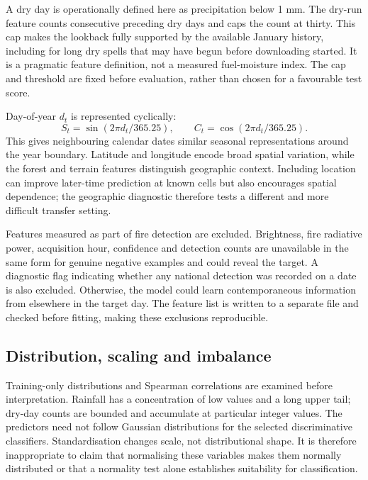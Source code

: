 \documentclass[conference,a4paper]{IEEEtran}
\begin{document}
A dry day is operationally defined here as precipitation below 1 mm. The dry-run feature counts consecutive preceding dry days and caps the count at thirty. This cap makes the lookback fully supported by the available January history, including for long dry spells that may have begun before downloading started. It is a pragmatic feature definition, not a measured fuel-moisture index. The cap and threshold are fixed before evaluation, rather than chosen for a favourable test score.

Day-of-year $d_t$ is represented cyclically:
\begin{equation}
S_t=\sin(2\pi d_t/365.25),\qquad C_t=\cos(2\pi d_t/365.25).
\end{equation}
This gives neighbouring calendar dates similar seasonal representations around the year boundary. Latitude and longitude encode broad spatial variation, while the forest and terrain features distinguish geographic context. Including location can improve later-time prediction at known cells but also encourages spatial dependence; the geographic diagnostic therefore tests a different and more difficult transfer setting.

Features measured as part of fire detection are excluded. Brightness, fire radiative power, acquisition hour, confidence and detection counts are unavailable in the same form for genuine negative examples and could reveal the target. A diagnostic flag indicating whether any national detection was recorded on a date is also excluded. Otherwise, the model could learn contemporaneous information from elsewhere in the target day. The feature list is written to a separate file and checked before fitting, making these exclusions reproducible.

\subsection{Distribution, scaling and imbalance}
Training-only distributions and Spearman correlations are examined before interpretation. Rainfall has a concentration of low values and a long upper tail; dry-day counts are bounded and accumulate at particular integer values. The predictors need not follow Gaussian distributions for the selected discriminative classifiers. Standardisation changes scale, not distributional shape. It is therefore inappropriate to claim that normalising these variables makes them normally distributed or that a normality test alone establishes suitability for classification.
\end{document}
